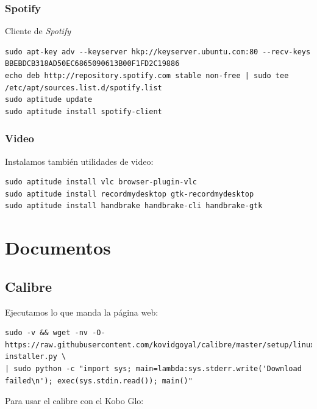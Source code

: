 \documentclass[12pt,spanish,]{article}
\begin{document}
\subsubsection{Spotify}\label{spotify}

Cliente de \emph{Spotify}

\begin{verbatim}
sudo apt-key adv --keyserver hkp://keyserver.ubuntu.com:80 --recv-keys BBEBDCB318AD50EC6865090613B00F1FD2C19886
echo deb http://repository.spotify.com stable non-free | sudo tee /etc/apt/sources.list.d/spotify.list
sudo aptitude update
sudo aptitude install spotify-client
\end{verbatim}

\subsubsection{Video}\label{video}

Instalamos también utilidades de video:

\begin{verbatim}
sudo aptitude install vlc browser-plugin-vlc
sudo aptitude install recordmydesktop gtk-recordmydesktop
sudo aptitude install handbrake handbrake-cli handbrake-gtk
\end{verbatim}

\section{Documentos}\label{documentos}

\subsection{Calibre}\label{calibre}

Ejecutamos lo que manda la página web:

\begin{verbatim}
sudo -v && wget -nv -O- https://raw.githubusercontent.com/kovidgoyal/calibre/master/setup/linux-installer.py \
| sudo python -c "import sys; main=lambda:sys.stderr.write('Download failed\n'); exec(sys.stdin.read()); main()"
\end{verbatim}

Para usar el calibre con el Kobo Glo:
\end{document}
